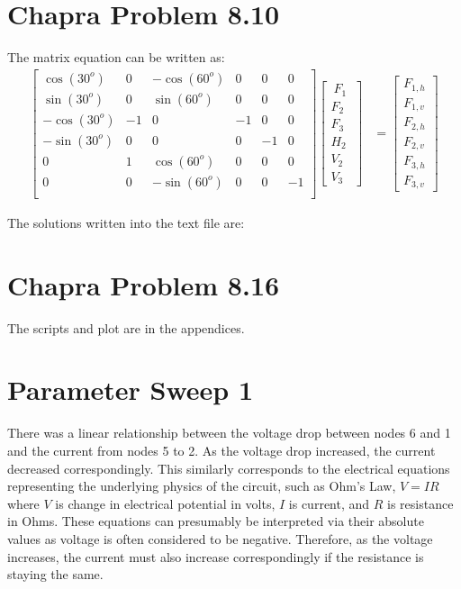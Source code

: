 \documentclass{article}
\begin{document}
\section{Chapra Problem 8.10}
The matrix equation can be written as:
\begin{align*}
\begin{bmatrix}
\cos(30^o) & 0 & -\cos(60^o) & 0 & 0 & 0\\
\sin(30^o) & 0 & \sin(60^o) & 0 & 0 & 0\\
-\cos(30^o) & -1 & 0 & -1 & 0 & 0\\
-\sin(30^o) & 0 & 0 & 0 & -1 & 0\\
0 & 1 & \cos(60^o) & 0 & 0 & 0\\
0 & 0 & -\sin(60^o) & 0 & 0 & -1\\
\end{bmatrix}
\begin{bmatrix}
~F_1~ \\ F_2 \\ F_3 \\ H_2 \\ V_2 \\ V_3
\end{bmatrix}&=
\begin{bmatrix}
F_{1,h} \\  F_{1,v} \\ F_{2,h} \\  F_{2,v} \\ F_{3,h} \\ F_{3,v} %
\end{bmatrix}
\end{align*}

The solutions written into the text file are:


\section{Chapra Problem 8.16}
The scripts and plot are in the appendices.

\section{Parameter Sweep 1}
There was a linear relationship between the voltage drop between nodes 6 and 1 and the current from nodes 5 to 2. As the voltage drop increased, the current decreased correspondingly. This similarly corresponds to the electrical equations representing the underlying physics of the circuit, such as Ohm's Law, $V=IR$ where $V$ is change in electrical potential in volts, $I$ is current, and $R$ is resistance in Ohms. These equations can presumably be interpreted via their absolute values as voltage is often considered to be negative. Therefore, as the voltage increases, the current must also increase correspondingly if the resistance is staying the same. 
\end{document}
